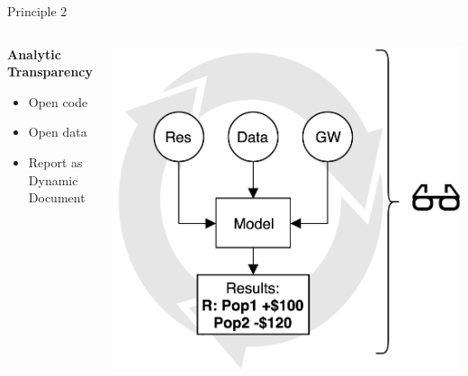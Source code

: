 \documentclass{beamer}
\begin{document}
\begin{frame}{Principle 2}
\begin{columns}
\begin{column}{0.3\textwidth}
   \textbf{Analytic Transparency}
   \begin{itemize}
   \item Open code
   \item Open data
   \item  Report as Dynamic Document    
   \end{itemize}
\end{column}
\begin{column}{0.7\textwidth}  %
    \begin{center}
     \includegraphics[width=1\textwidth]{../Images/a_transp.png}
     \end{center}
\end{column}
\end{columns}
\end{frame}
\end{document}
